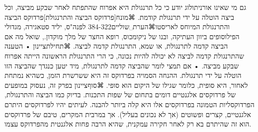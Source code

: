 ﻿גם מי שאינו אורניתולוג יודע כי כל תרנגולת היא אפרוח שהתפתח לאחר שבקע מביצה, וכל ביצה הוטלה על ידי תרנגולת קודמת. ⌘מונח[פרדוקס הביצה והתרנגולת]{פרדוקס הביצה והתרנגולת} המיוחס לאריסטו⌘הערת␣שוליים{384-322 לפנה"ס, יליד סטאגירה, מגדולי הפילוסופים ביוון העתיקה, ובנו של ניקומכוס, רופא החצר של מלך מוקדון.}, שואל מה אם הביצה קדמה לתרנגולת, או שמא, התרנגולת קדמה לביצה. 
⌘תחילת{ציינון}
• הטענה שהתרנגולת קדמה לביצה לא יכולה להיות נכונה, כי הרי התרנגולת הראשונה הייתה אפרוח שבקע מביצה.
• אם תמצי לומר שהביצה קדמה לתרנגולת, מיד יטען כנגדך שהביצה הזו הוטלה על ידי תרנגולת. 
ההנחה הסמויה בפרדוקס זה היא ששרשרת הזמן, כשהיא נמתחת לאחור, היא סופית, כלומר שגילו של היקום הוא סופי.
⌘סוף{ציינון}
בפרק זה, נעסוק במופעים של פרדוקסים אלגנטיים דומים בתחום של שפות התכנות. בדיוק כמו הביצה והתרנגולת, הפרדוקסליות הטמונה בפרדוקסים אלו היא קלה ביותר להבנה. לעיתים יהיו לפרדוקסים היתרם אלגנטיים, קצרים ופשוטים (אך לא נכונים בעליל). אך במרבית המקרים, טיבם של פרדוקסים הוא זה שהיתרם בא רק לאחר חקירה עמקנית, שהיא הרבה פחות אלגנטית מהפרדוקס עצמו.

